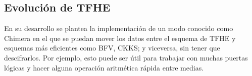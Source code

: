 \subsection{Evolución de TFHE}

En su desarrollo se plantea la implementación de un modo conocido como Chimera \cite{tfhe-chimera} en el que se puedan mover los datos entre el esquema de TFHE y esquemas más eficientes como BFV, CKKS; y viceversa, sin tener que descifrarlos. Por ejemplo, esto puede ser útil para trabajar con muchas puertas lógicas y hacer alguna operación aritmética rápida entre medias.